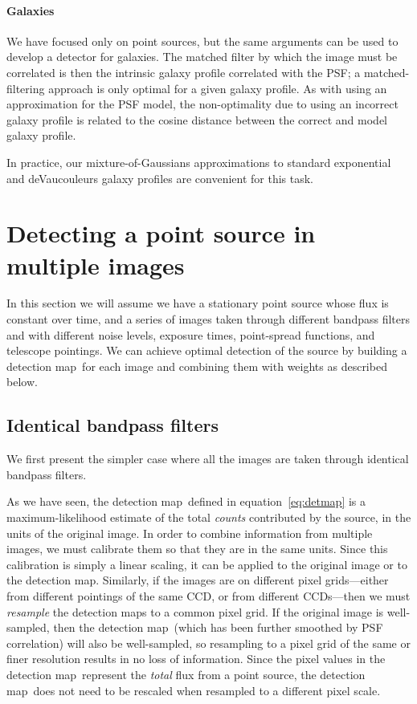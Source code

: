 \documentclass[letterpaper,preprint]{aastex62}
\newcommand{\equationname}{equation}
\newcommand{\eqnref}[1]{\mbox{\equationname~\ref{#1}}}
\newcommand{\detmap}{detection map}
\begin{document}
\paragraph{Galaxies}
We have focused only on point sources, but the same arguments can be
used to develop a detector for galaxies.  The matched filter by which
the image must be correlated is then the intrinsic galaxy profile
correlated with the PSF; a matched-filtering approach is only optimal
for a given galaxy profile.  As with using an approximation for the
PSF model, the non-optimality due to using an incorrect galaxy profile
is related to the cosine distance between the correct and model galaxy
profile.

In practice, our mixture-of-Gaussians approximations to standard
exponential and deVaucouleurs galaxy profiles \citep{gaussgals} are
convenient for this task.



\section{Detecting a point source in multiple images}

In this section we will assume we have a stationary point source whose
flux is constant over time, and a series of images taken through
different bandpass filters and with different noise levels, exposure
times, point-spread functions, and telescope pointings.  We can
achieve optimal detection of the source by building a \detmap\ for
each image and combining them with weights as described below.



\subsection{Identical bandpass filters}

We first present the simpler case where all the images are taken
through identical bandpass filters.

As we have seen, the \detmap\ defined in \eqnref{eq:detmap} is a
maximum-likelihood estimate of the total \emph{counts} contributed by
the source, in the units of the original image.  In order to
combine information from multiple images, we must calibrate them so
that they are in the same units.  Since this calibration is simply a
linear scaling, it can be applied to the original image or to the
\detmap.  Similarly, if the images are on different pixel
grids---either from different pointings of the same CCD, or from
different CCDs---then we must \emph{resample} the \detmap s to a
common pixel grid.
%
If the original image is well-sampled, then the \detmap\ (which has
been further smoothed by PSF correlation) will also be well-sampled,
so resampling to a pixel grid of the same or finer resolution results
in no loss of information.
%
Since the pixel values in the \detmap\ represent the \emph{total} flux
from a point source, the \detmap\ does not need to be rescaled when
resampled to a different pixel scale.
\end{document}
